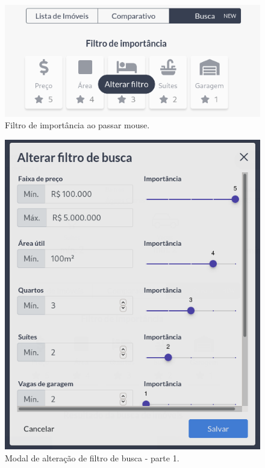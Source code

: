 \begin{figure}[H]
    \centering
    \includegraphics[scale=0.5]{figuras/desenvolvimento/componente_filtro2.png}
    \caption[Filtro de importância ao passar mouse]{Filtro de importância ao passar mouse.}
    \label{fig:componente_filtro2}
\end{figure}

\begin{figure}[H]
    \centering
    \includegraphics[scale=0.35]{figuras/desenvolvimento/componente_filtro3.png}
    \caption[Modal de alteração de filtro de busca - parte 1]{Modal de alteração de filtro de busca - parte 1.}
    \label{fig:componente_filtro3}
\end{figure}

